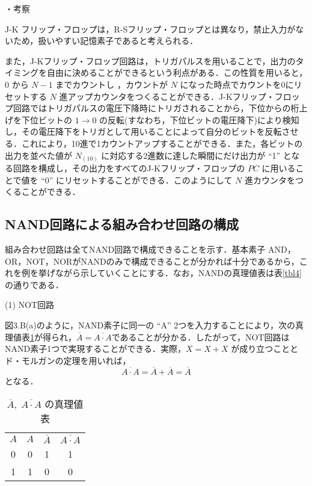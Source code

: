 
\renewcommand{\thetable}{\arabic{section}.\arabic{table}}
\renewcommand{\theequation}{\arabic{section}.\arabic{subsection}.\arabic{equation}}

\vspace{7mm}
\noindent
・考察 \vspace{2mm}

J-K フリップ・フロップは，R-Sフリップ・フロップとは異なり，禁止入力がないため，扱いやすい記憶素子であると考えられる．


また，J-Kフリップ・フロップ回路は，トリガパルスを用いることで，出力のタイミングを自由に決めることができるという利点がある．この性質を用いると，0 から $N-1$ までカウントし
，カウントが $N$ になった時点でカウントを0にリセットする $N$ 進アップカウンタをつくることができる．J-Kフリップ・フロップ回路ではトリガパルスの電圧下降時にトリガされることから，下位からの桁上げを下位ビットの $1 \rightarrow 0$ の反転(すなわち，下位ビットの電圧降下)により検知し，その電圧降下をトリガとして用いることによって自分のビットを反転させる．これにより，10進で1カウントアップすることができる．また，各ビットの出力を並べた値が $N_{(10)}$ に対応する2進数に達した瞬間にだけ出力が ``1'' となる回路を構成し，その出力をすべてのJ-Kフリップ・フロップの $PC$ に用いることで値を ``0'' にリセットすることができる．このようにして $N$ 進カウンタをつくることができる．
\newpage
\subsection{NAND回路による組み合わせ回路の構成}

組み合わせ回路は全てNAND回路で構成できることを示す．基本素子 AND，OR，NOT，NORがNANDのみで構成できることが分かれば十分であるから，これを例を挙げながら示していくことにする．なお，NANDの真理値表は表\ref{tbl4}の通りである．

\vspace{7mm}
\noindent
(1) NOT回路 \vspace{2mm}

図3.B(a)のように，NAND素子に同一の ``A'' 2つを入力することにより，次の真理値表\ref{tbl01}が得られ，$\overline{A} = \overline{A \cdot A}$であることが分かる．したがって，NOT回路はNAND素子1つで実現することができる．実際，$X = X + X$ が成り立つこととド・モルガンの定理を用いれば，
$$
    \overline{A \cdot A} = \overline{A} + \overline{A} = \overline{A}
$$
となる．

\begin{table}[!h]
    \caption{$\overline{A},\;\overline{A \cdot A}$ の真理値表}
    \label{tbl01}
    \begin{center}
        \begin{tabular}{|c|c||c|c|}
            \hline
            $A$ & $A$ & $\overline{A}$ & $\overline{A \cdot A}$ \\
            \hhline{|=|=#=|=|}
            0   & 0   & 1              & 1                      \\
            \hline
            1   & 1   & 0              & 0                      \\
            \hline
        \end{tabular}
    \end{center}
\end{table}

